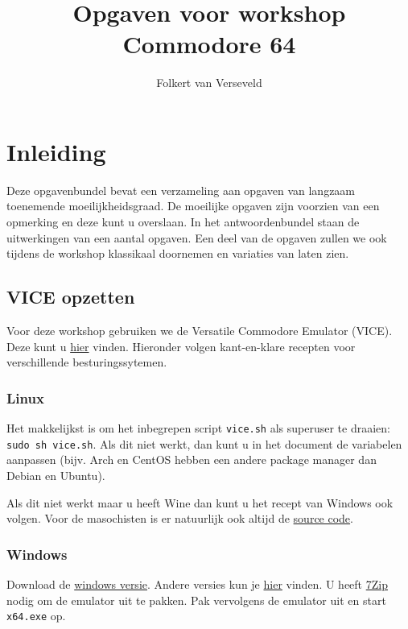 \documentclass{article}
\title{Opgaven voor workshop Commodore 64}
\author{Folkert van Verseveld}
\begin{document}
\maketitle

\section{Inleiding}

Deze opgavenbundel bevat een verzameling aan opgaven van langzaam toenemende moeilijkheidsgraad.
De moeilijke opgaven zijn voorzien van een opmerking en deze kunt u overslaan.
In het antwoordenbundel staan de uitwerkingen van een aantal opgaven.
Een deel van de opgaven zullen we ook tijdens de workshop klassikaal doornemen en variaties van laten zien.

\subsection{VICE opzetten}
Voor deze workshop gebruiken we de Versatile Commodore Emulator (VICE).
Deze kunt u \href{http://vice-emu.sourceforge.net/}{hier} vinden.
Hieronder volgen kant-en-klare recepten voor verschillende besturingssytemen.

\subsubsection{Linux}
Het makkelijkst is om het inbegrepen script \verb:vice.sh: als superuser te draaien:
\verb:sudo sh vice.sh:.
Als dit niet werkt, dan kunt u in het document de variabelen aanpassen (bijv. Arch en CentOS hebben een andere package manager dan Debian en Ubuntu).

Als dit niet werkt maar u heeft Wine dan kunt u het recept van Windows ook volgen.
Voor de masochisten is er natuurlijk ook altijd de \href{http://sourceforge.net/projects/vice-emu/files/releases/vice-3.1.tar.gz/download}{source code}.

\subsubsection{Windows}
Download de \href{http://sourceforge.net/projects/vice-emu/files/releases/binaries/windows/WinVICE-3.1-x64.7z/download}{windows versie}.
Andere versies kun je \href{http://vice-emu.sourceforge.net/windows.html}{hier} vinden.
U heeft \href{http://www.7-zip.org/}{7Zip} nodig om de emulator uit te pakken.
Pak vervolgens de emulator uit en start \verb:x64.exe: op.
\end{document}

